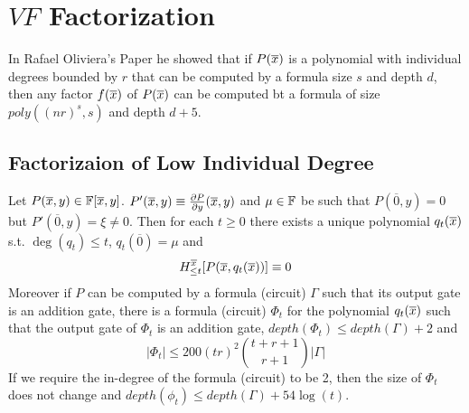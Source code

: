 \chapter{$VF$ Factorization}

In Rafael Oliviera's Paper \cite{oliveiraFactorsLowIndividual2016} he showed that if $P(\overline{x})$ is a polynomial with individual degrees bounded by $r$ that can be computed by a formula size $s$ and depth $d$, then any factor $f(\overline{x})$ of $P(\overline{x})$ can be computed bt a formula of size $poly((nr)^s,s)$ and depth $d+5$.
\section{Factorizaion of Low Individual Degree}

\begin{lemma}\label{apprlem}
	Let $P(\overline{x}, y)\in \mathbb{F}[\overline{x},y]$. $P'(\overline{x},y)\equiv \frac{\partial P}{\partial y}(\overline{x},y)$ and $\mu\in \mathbb{F}$ be such that $P(\overline{0},y)=0$ but $P'(\overline{0},y)=\xi\neq 0$. Then for each $t\geq 0$ there exists a unique polynomial $q_t(\overline{x})$ s.t. $\deg(q_t)\leq t$, $q_t(\overline{0})=\mu$ and $$H_{\leq t}^{\overline{x}}[P(\overline{x},q_t(\overline{x}))]\equiv 0$$Moreover if $P$ can be computed by a formula (circuit) $\Gamma$ such that its output gate is an addition gate, there is a formula (circuit) $\Phi_t$ for the polynomial $q_t(\overline{x})$ such that the output gate of $\Phi_t$ is an addition gate, $depth(\Phi_t)\leq depth(\Gamma)+2$ and $$|\Phi_t|\leq 200(tr)^2{{t+r+1}\choose{r+1}}|\Gamma|$$If we require the in-degree of the formula (circuit) to be 2, then the size of $\Phi_t$ does not change and $depth(\phi_t)\leq depth(\Gamma)+54\log(t)$.
\end{lemma}
